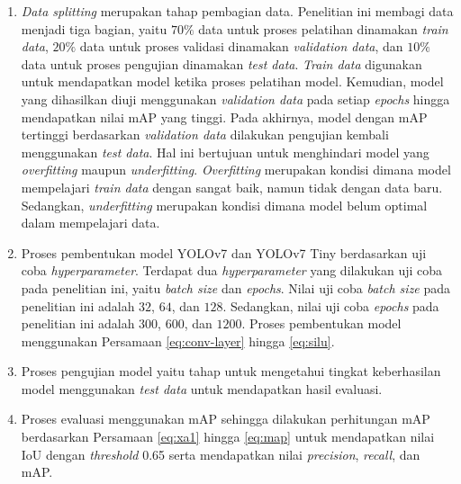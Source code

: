 \begin{enumerate}
    \item \textit{Data splitting} merupakan tahap pembagian data. Penelitian ini membagi data menjadi tiga bagian, yaitu $70\%$ data untuk proses pelatihan dinamakan \textit{train data}, $20\%$ data untuk proses validasi dinamakan \textit{validation data}, dan $10\%$ data untuk proses pengujian dinamakan \textit{test data}. \textit{Train data} digunakan untuk mendapatkan model ketika proses pelatihan model. Kemudian, model yang dihasilkan diuji menggunakan \textit{validation data} pada setiap \textit{epochs} hingga mendapatkan nilai mAP yang tinggi. Pada akhirnya, model dengan mAP tertinggi berdasarkan \textit{validation data} dilakukan pengujian kembali menggunakan \textit{test data}. Hal ini bertujuan untuk menghindari model yang \textit{overfitting} maupun \textit{underfitting}. \textit{Overfitting} merupakan kondisi dimana model mempelajari \textit{train data} dengan sangat baik, namun tidak dengan data baru. Sedangkan, \textit{underfitting} merupakan kondisi dimana model belum optimal dalam mempelajari data.
    \item Proses pembentukan model YOLOv7 dan YOLOv7 Tiny berdasarkan uji coba \textit{hyperparameter}. Terdapat dua \textit{hyperparameter} yang dilakukan uji coba pada penelitian ini, yaitu \textit{batch size} dan \textit{epochs}. Nilai uji coba \textit{batch size} pada penelitian ini adalah $32$, $64$, dan $128$. Sedangkan, nilai uji coba \textit{epochs} pada penelitian ini adalah $300$, $600$, dan $1200$. Proses pembentukan model menggunakan Persamaan \ref{eq:conv-layer} hingga \ref{eq:silu}.
    \item Proses pengujian model yaitu tahap untuk mengetahui tingkat keberhasilan model menggunakan \textit{test data} untuk mendapatkan hasil evaluasi.
    \item Proses evaluasi menggunakan mAP sehingga dilakukan perhitungan mAP berdasarkan Persamaan \ref{eq:xa1} hingga \ref{eq:map} untuk mendapatkan nilai IoU dengan \textit{threshold} 0.65 serta mendapatkan nilai \textit{precision}, \textit{recall}, dan mAP.
\end{enumerate}
